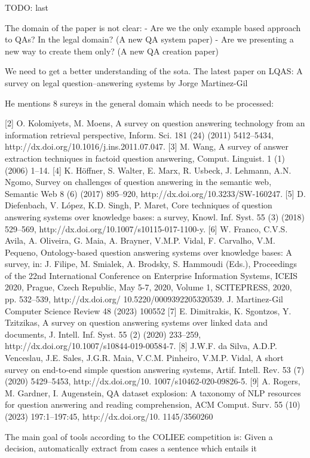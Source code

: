 \documentclass{IOS-Book-Article}
\begin{document}
TODO: last

The domain of the paper is not clear:
- Are we the only example based approach to QAs? In the legal domain? (A new QA system paper)
- Are we presenting a new way to create them only? (A new QA creation paper)

We need to get a better understanding of the sota. The latest paper on LQAS: A survey on legal question–answering systems by Jorge Martinez-Gil

He mentions 8 sureys in the general domain which needs to be processed:

[2] O. Kolomiyets, M. Moens, A survey on question answering technology
from an information retrieval perspective, Inform. Sci. 181 (24) (2011)
5412–5434, http://dx.doi.org/10.1016/j.ins.2011.07.047.
[3] M. Wang, A survey of answer extraction techniques in factoid question
answering, Comput. Linguist. 1 (1) (2006) 1–14.
[4] K. Höffner, S. Walter, E. Marx, R. Usbeck, J. Lehmann, A.N. Ngomo, Survey
on challenges of question answering in the semantic web, Semantic Web
8 (6) (2017) 895–920, http://dx.doi.org/10.3233/SW-160247.
[5] D. Diefenbach, V. López, K.D. Singh, P. Maret, Core techniques of question
answering systems over knowledge bases: a survey, Knowl. Inf. Syst. 55
(3) (2018) 529–569, http://dx.doi.org/10.1007/s10115-017-1100-y.
[6] W. Franco, C.V.S. Avila, A. Oliveira, G. Maia, A. Brayner, V.M.P. Vidal,
F. Carvalho, V.M. Pequeno, Ontology-based question answering systems
over knowledge bases: A survey, in: J. Filipe, M. Smialek, A. Brodsky, S.
Hammoudi (Eds.), Proceedings of the 22nd International Conference on
Enterprise Information Systems, ICEIS 2020, Prague, Czech Republic, May
5-7, 2020, Volume 1, SCITEPRESS, 2020, pp. 532–539, http://dx.doi.org/
10.5220/0009392205320539.
J. Martinez-Gil Computer Science Review 48 (2023) 100552
[7] E. Dimitrakis, K. Sgontzos, Y. Tzitzikas, A survey on question answering
systems over linked data and documents, J. Intell. Inf. Syst. 55 (2) (2020)
233–259, http://dx.doi.org/10.1007/s10844-019-00584-7.
[8] J.W.F. da Silva, A.D.P. Venceslau, J.E. Sales, J.G.R. Maia, V.C.M. Pinheiro,
V.M.P. Vidal, A short survey on end-to-end simple question answering
systems, Artif. Intell. Rev. 53 (7) (2020) 5429–5453, http://dx.doi.org/10.
1007/s10462-020-09826-5.
[9] A. Rogers, M. Gardner, I. Augenstein, QA dataset explosion: A taxonomy
of NLP resources for question answering and reading comprehension,
ACM Comput. Surv. 55 (10) (2023) 197:1–197:45, http://dx.doi.org/10.
1145/3560260

The main goal of tools according to the COLIEE competition is: Given a decision, automatically extract from cases a sentence which entails it
\end{document}
